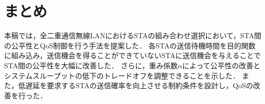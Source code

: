 \documentclass[technicalreport]{ieicej}
\begin{document}
\section{まとめ}
本稿では，全二重通信無線LANにおけるSTAの組み合わせ選択において，STA間の公平性とQoS制御を行う手法を提案した．
各STAの送信待機時間を目的関数に組み込み，送信機会を得ることができていないSTAに送信機会を与えることで
STA間の公平性を大幅に改善した．
さらに，重み係数$\alpha$によって公平性の改善とシステムスループットの低下のトレードオフを調整できることを示した．
また，低遅延を要求するSTAの送信確率を向上させる制約条件を設計し，QoSの改善を行った．



\end{document}
